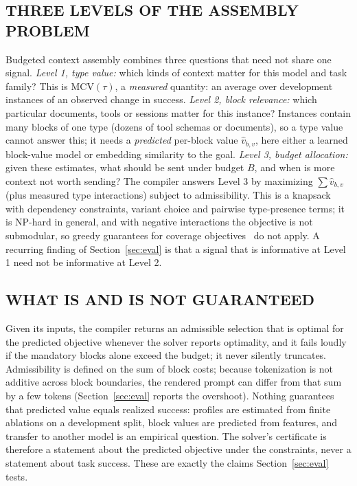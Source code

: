 \subsection{THREE LEVELS OF THE ASSEMBLY PROBLEM}
Budgeted context assembly combines three questions that need not share one signal.
\emph{Level 1, type value:} which kinds of context matter for this model and task family? This is
$\mathrm{MCV}(\tau)$, a \emph{measured} quantity: an average over development instances of an observed change in success.
\emph{Level 2, block relevance:} which particular documents, tools or sessions matter for this instance? Instances
contain many blocks of one type (dozens of tool schemas or documents), so a type value cannot answer this; it needs a
\emph{predicted} per-block value $\hat v_{b,v}$, here either a learned block-value model or embedding similarity to the
goal. \emph{Level 3, budget allocation:} given these estimates, what should be sent under budget $B$, and when is more
context not worth sending? The compiler answers Level 3 by maximizing $\sum \hat v_{b,v}$ (plus measured type
interactions) subject to admissibility. This is a knapsack with dependency constraints, variant choice and pairwise
type-presence terms; it is NP-hard in general, and with negative interactions the objective is not submodular, so greedy
guarantees for coverage objectives~\cite{pacms2026,skillselect2026} do not apply. A recurring finding of
Section~\ref{sec:eval} is that a signal that is informative at Level 1 need not be informative at Level 2.

\subsection{WHAT IS AND IS NOT GUARANTEED}
Given its inputs, the compiler returns an admissible selection that is optimal for the predicted objective whenever the
solver reports optimality, and it fails loudly if the mandatory blocks alone exceed the budget; it never silently
truncates. Admissibility is defined on the sum of block costs; because tokenization is not additive across block
boundaries, the rendered prompt can differ from that sum by a few tokens (Section~\ref{sec:eval} reports the overshoot). Nothing guarantees that predicted value equals realized success: profiles are estimated from finite ablations
on a development split, block values are predicted from features, and transfer to another model is an empirical
question. The solver's certificate is therefore a statement about the predicted objective under the constraints, never a
statement about task success. These are exactly the claims Section~\ref{sec:eval} tests.
